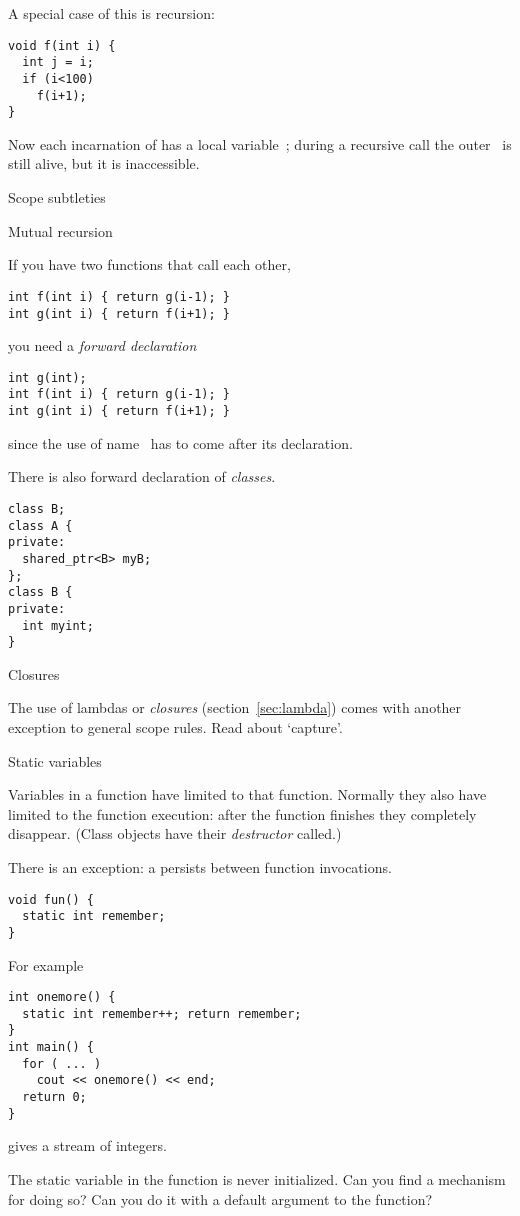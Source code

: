 A special case of this is recursion:
\begin{verbatim}
void f(int i) {
  int j = i;
  if (i<100)
    f(i+1);
}
\end{verbatim}
Now each incarnation of  has a local variable~; during a
recursive call the outer~ is still alive, but it is inaccessible.

 {Scope subtleties}

 {Mutual recursion}

If you have two functions  that call each other,
\begin{verbatim}
int f(int i) { return g(i-1); }
int g(int i) { return f(i+1); }
\end{verbatim}
you need a
%
\emph{forward declaration}
%
\begin{verbatim}
int g(int);
int f(int i) { return g(i-1); }
int g(int i) { return f(i+1); }
\end{verbatim}
since the use of name~ has to come after its declaration.

There is also forward declaration of
%
\emph{classes}.
\begin{verbatim}
class B;
class A {
private:
  shared_ptr<B> myB;
};
class B {
private:
  int myint;
}
\end{verbatim}

 {Closures}

The use of 
%
lambdas
or
%
\emph{closures} (section~\ref{sec:lambda}) comes with
another exception to general scope rules. Read about `capture'.

 {Static variables}
\label{sec:static-scope}

Variables in a function have  limited to
that function. Normally they also have 
limited to the function execution: after the function finishes they
completely disappear. (Class objects have their
%
\emph{destructor}
called.)

There is an exception: a  persists
between function invocations.
\begin{verbatim}
void fun() {
  static int remember;
}
\end{verbatim}
For example
\begin{verbatim}
int onemore() {
  static int remember++; return remember;
}
int main() {
  for ( ... )
    cout << onemore() << end;
  return 0;
}
\end{verbatim}
gives a stream of integers.
\begin{exercise}
  The static variable in the  function is never
  initialized. Can you find a mechanism for doing so?
  Can you do it with a default argument to the function?
\end{exercise}

